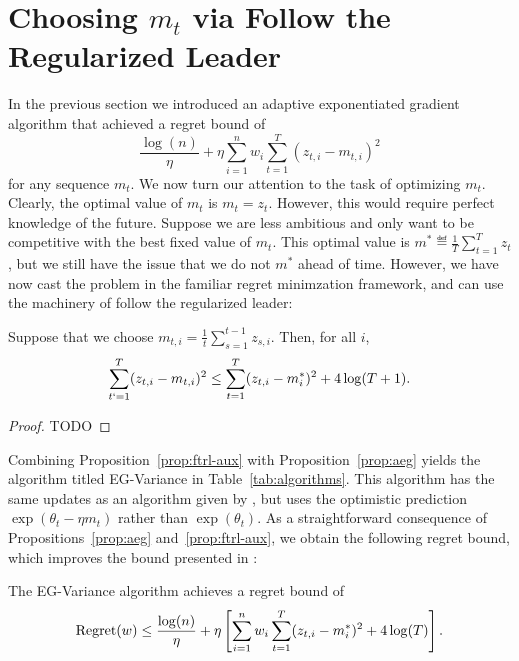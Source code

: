 \documentclass[paper_icml.tex]{subfiles}
\begin{document}
\section{Choosing $m_t$ via Follow the Regularized Leader} 
\label{sec:ftrl-aux}
In the previous section we introduced an adaptive exponentiated 
gradient algorithm that achieved a regret bound of 
\[ \frac{\log(n)}{\eta} + \eta \sum_{i=1}^n w_i \sum_{t=1}^T (z_{t,i} - m_{t,i})^2 \]
for any sequence $m_t$. We now turn our attention to the task of 
optimizing $m_t$. Clearly, the optimal value of $m_t$ is $m_t = z_t$. However, 
this would require perfect knowledge of the future. Suppose we are less ambitious 
and only want to be competitive with the best fixed value of $m_t$. This optimal value 
is $m^* \eqdef \frac{1}{T} \sum_{t=1}^T z_t$, but we still have the issue that 
we do not $m^*$ ahead of time. However, we have now cast the problem in the familiar 
regret minimzation framework, and can use the machinery of follow the regularized 
leader:
\begin{proposition}
\label{prop:ftrl-aux}
Suppose that we choose $m_{t,i} = \frac{1}{t} \sum_{s=1}^{t-1} z_{s,i}$. 
Then, for all $i$, 
\[ \sum_{t`=1}^T (z_{t,i} - m_{t,i})^2 \leq \sum_{t=1}^T (z_{t,i} - m^*_i)^2 + 4\log(T+1). \]
\end{proposition}
\begin{proof}
TODO
\end{proof}
Combining Proposition~\ref{prop:ftrl-aux} with Proposition~\ref{prop:aeg} yields 
the algorithm titled EG-Variance in Table~\ref{tab:algorithms}. This algorithm has the 
same updates as an algorithm given by \cite{hazan2010variation}, but uses the 
optimistic prediction $\exp(\theta_t - \eta m_t)$ rather than $\exp(\theta_t)$. 
As a straightforward consequence of Propositions~\ref{prop:aeg} and~\ref{prop:ftrl-aux}, we 
obtain the following regret bound, which improves the bound presented in 
\cite{hazan2010variation}:
\begin{corollary}
The EG-Variance algorithm achieves a regret bound of
\[ \operatorname{Regret}(w) \leq \frac{\log(n)}{\eta} + \eta \left[ \sum_{i=1}^n w_i \sum_{t=1}^T (z_{t,i} - m_i^*)^2 + 4\log(T) \right]. \]
\end{corollary}
\end{document}
